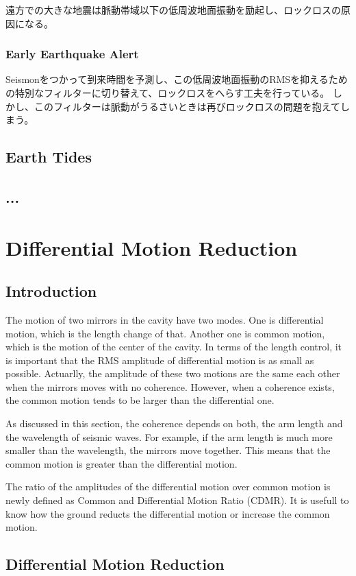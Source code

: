 遠方での大きな地震は脈動帯域以下の低周波地面振動を励起し、ロックロスの原因になる。
\subsubsection{Early Earthquake Alert}
Seismonをつかって到来時間を予測し、この低周波地面振動のRMSを抑えるための特別なフィルターに切り替えて、ロックロスをへらす工夫を行っている。
しかし、このフィルターは脈動がうるさいときは再びロックロスの問題を抱えてしまう。
\subsection{Earth Tides}

\subsection{...}



\section{Differential Motion Reduction}
\subsection{Introduction}
The motion of two mirrors in the cavity have two modes. One is differential motion, which is the length change of that. Another one is common motion, which is the motion of the center of the cavity. In terms of the length control, it is important that the RMS amplitude of differential motion is as small as possible. Actuarlly, the amplitude of these two motions are the same each other when the mirrors moves with no coherence. However, when a coherence exists, the common motion tends to be larger than the differential one. 

As discussed in this section, the coherence depends on both, the arm length and the wavelength of seismic waves. For example, if the arm length is much more smaller than the wavelength, the mirrors move together. This means that the common motion is greater than the differential motion.

The ratio of the amplitudes of the differential motion over common motion is newly defined as Common and Differential Motion Ratio (CDMR). It is usefull to know how the ground reducts the differential motion or increase the common motion. 

\subsection{Differential Motion Reduction}
